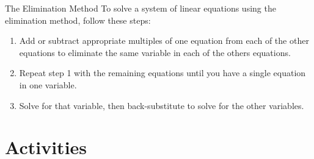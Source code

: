 \documentclass{article}
\begin{document}
\begin{calloutbox}{The Elimination Method}\label{box:elimination-method}
    To solve a system of linear equations using the elimination method, follow these steps:
    \begin{enumerate}
        \item Add or subtract appropriate multiples of one equation from each of the other equations to eliminate the same variable in each of the others equations.
        \item Repeat step 1 with the remaining equations until you have a single equation in one variable.
        \item Solve for that variable, then back-substitute to solve for the other variables.
    \end{enumerate}
\end{calloutbox}

\section{Activities}\label{sec-activities}
\end{document}
